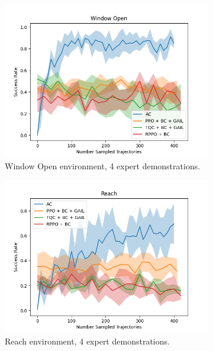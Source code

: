 \begin{figure}[htbp]
    \centering
    \begin{subfigure}[t]{0.45\textwidth}
      \includegraphics[width=\textwidth]{images/FineTuning/Window Open.png}
      \caption{Window Open environment, 4 expert demonstrations.}
      \label{fig:plot3}
    \end{subfigure}
    \begin{subfigure}[t]{0.45\textwidth}
      \includegraphics[width=\textwidth]{images/FineTuning/Reach.png}
      \caption{Reach environment, 4 expert demonstrations.}
      \label{fig:plot1}
    \end{subfigure}
    \medskip
    \begin{subfigure}[t]{0.45\textwidth}

\end{subfigure}
\end{figure}
